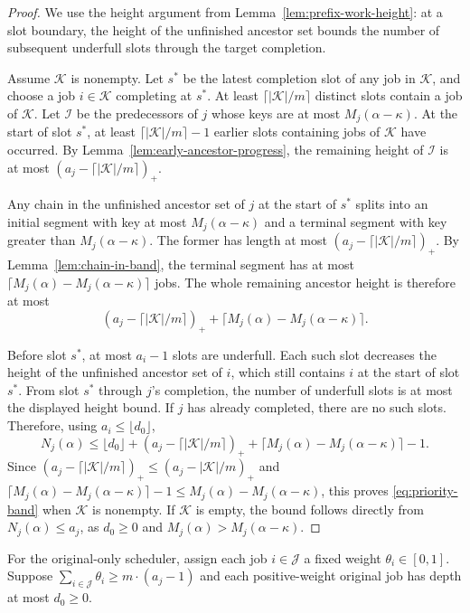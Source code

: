 \begin{proof}
We use the height argument from Lemma~\ref{lem:prefix-work-height}:
at a slot boundary, the height of the unfinished ancestor set bounds the
number of subsequent underfull slots through the target completion.

Assume $\mathcal K$ is nonempty. Let $s^*$ be the latest completion slot
of any job in $\mathcal K$, and choose a job $i\in\mathcal K$ completing at
$s^*$. At least $\lceil|\mathcal K|/m\rceil$ distinct slots contain a job
of $\mathcal K$. Let $\mathcal I$ be the predecessors of $j$ whose keys are
at most $M_j(\alpha-\kappa)$. At the start of slot $s^*$, at least
$\lceil|\mathcal K|/m\rceil-1$ earlier slots containing jobs of $\mathcal K$
have occurred. By
Lemma~\ref{lem:early-ancestor-progress}, the remaining height of $\mathcal I$
is at most $(a_j-\lceil|\mathcal K|/m\rceil)_+$.

Any chain in the unfinished ancestor set of $j$ at the start of $s^*$
splits into an initial segment with key at most $M_j(\alpha-\kappa)$ and a terminal
segment with key greater than $M_j(\alpha-\kappa)$. The former has length at most
$(a_j-\lceil|\mathcal K|/m\rceil)_+$. By Lemma~\ref{lem:chain-in-band}, the terminal segment
has at most $\lceil M_j(\alpha)-M_j(\alpha-\kappa)\rceil$ jobs. The whole remaining ancestor height is therefore
at most
\[
 (a_j-\lceil|\mathcal K|/m\rceil)_++\lceil M_j(\alpha)-M_j(\alpha-\kappa)\rceil.
\]

Before slot $s^*$, at most $a_i-1$ slots are underfull. Each such slot
decreases the height of the unfinished ancestor set of $i$, which still
contains $i$ at the start of slot $s^*$. From slot $s^*$ through $j$'s
completion, the number of underfull slots is at most the displayed height
bound. If $j$ has already completed, there are no such slots. Therefore,
using $a_i\le\lfloor d_0\rfloor$,
\[
 N_j(\alpha)\le\lfloor d_0\rfloor+(a_j-\lceil|\mathcal K|/m\rceil)_+
 +\lceil M_j(\alpha)-M_j(\alpha-\kappa)\rceil-1.
\]
Since $(a_j-\lceil|\mathcal K|/m\rceil)_+\le(a_j-|\mathcal K|/m)_+$ and
$\lceil M_j(\alpha)-M_j(\alpha-\kappa)\rceil-1\le M_j(\alpha)-M_j(\alpha-\kappa)$, this proves \eqref{eq:priority-band}
when $\mathcal K$ is nonempty. If $\mathcal K$ is empty, the bound follows
directly from $N_j(\alpha)\le a_j$, as
$d_0\ge0$ and $M_j(\alpha)>M_j(\alpha-\kappa)$.
\end{proof}

For the original-only scheduler, assign each job $i\in\mathcal J$ a
fixed weight $\theta_i\in[0,1]$. Suppose
$\sum_{i\in\mathcal J}\theta_i\ge m\cdot(a_j-1)$ and each positive-weight
original job has depth at most $d_0\ge0$.

